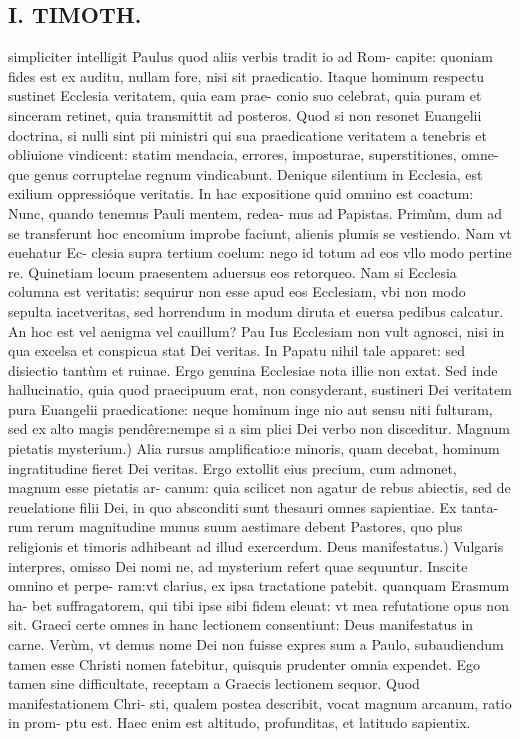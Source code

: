 \documentclass{article}
\begin{document}
\begin{pages}
\section*{I. TIMOTH. }
\marginpar{[ p.40 ]}\pstart simpliciter intelligit Paulus quod aliis verbis tradit io ad Rom- capite: quoniam fides est ex auditu, nullam fore, nisi sit praedicatio. Itaque hominum respectu sustinet Ecclesia veritatem, quia eam prae- conio suo celebrat, quia puram et sinceram retinet, quia transmittit ad posteros. Quod si non resonet Euangelii doctrina, si nulli sint pii ministri qui sua praedicatione veritatem a tenebris et obliuione vindicent: statim mendacia, errores, imposturae, superstitiones, omne- que genus corruptelae regnum vindicabunt. Denique silentium in Ecclesia, est exilium oppressióque veritatis. In hac expositione quid omnino est coactum: Nunc, quando tenemus Pauli mentem, redea- mus ad Papistas. Primùm, dum ad se transferunt hoc encomium improbe faciunt, alienis plumis se vestiendo. Nam vt euehatur Ec- clesia supra tertium coelum: nego id totum ad eos vllo modo pertine re. Quinetiam locum praesentem aduersus eos retorqueo. Nam si Ecclesia columna est veritatis: sequirur non esse apud eos Ecclesiam, vbi non modo sepulta iacetveritas, sed horrendum in modum diruta et euersa pedibus calcatur. An hoc est vel aenigma vel cauillum? Pau Ius Ecclesiam non vult agnosci, nisi in qua excelsa et conspicua stat Dei veritas. In Papatu nihil tale apparet: sed disiectio tantùm et ruinae. Ergo genuina Ecclesiae nota illie non extat. Sed inde hallucinatio, quia quod praecipuum erat, non consyderant, sustineri Dei veritatem pura Euangelii praedicatione: neque hominum inge nio aut sensu niti fulturam, sed ex alto magis pendêre:nempe si a sim plici Dei verbo non disceditur.  \pend\pstart Magnum pietatis mysterium.) Alia rursus amplificatio:e minoris, quam decebat, hominum ingratitudine fieret Dei veritas. Ergo extollit eius precium, cum admonet, magnum esse pietatis ar- canum: quia scilicet non agatur de rebus abiectis, sed de reuelatione filii Dei, in quo absconditi sunt thesauri omnes sapientiae. Ex tanta- rum rerum magnitudine munus suum aestimare debent Pastores, quo plus religionis et timoris adhibeant ad illud exercerdum.  \pend\pstart Deus manifestatus.) Vulgaris interpres, omisso Dei nomi ne, ad mysterium refert quae sequuntur. Inscite omnino et perpe- ram:vt clarius, ex ipsa tractatione patebit. quanquam Erasmum ha- bet suffragatorem, qui tibi ipse sibi fidem eleuat: vt mea refutatione opus non sit. Graeci certe omnes in hanc lectionem consentiunt: Deus manifestatus in carne. Verùm, vt demus nome Dei non fuisse expres sum a Paulo, subaudiendum tamen esse Christi nomen fatebitur, quisquis prudenter omnia expendet. Ego tamen sine difficultate, receptam a Graecis lectionem sequor. Quod manifestationem Chri- sti, qualem postea describit, vocat magnum arcanum, ratio in prom- ptu est. Haec enim est altitudo, profunditas, et latitudo sapientix.  \pend

\end{pages}
\end{document}
